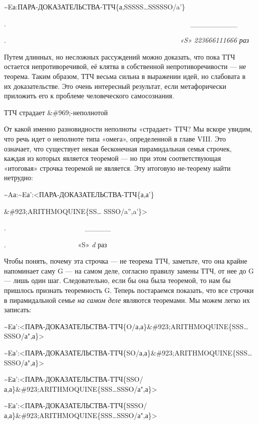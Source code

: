 \documentclass[../main.tex]{subfiles}
\begin{document}
\textasciitilde Eа:ПАРА-ДОКАЗАТЕЛЬСТВА-ТТЧ\{а,SSSSS\ldots SSSSSO/a'\}

.~~~~~~~~~~~~~~~~~~~~~~~~~~~~~~~~~~~~~~~~~~~~~~~~~~~~~\textbar\_\_\_\_\_\_\_\_\_\textbar{}

.~~~~~~~~~~~~~~~~~~~~~~~~~~~~~~~~~~~~~~~~~~~~~~~~~~\emph{«S» 223666111666 раз}

Путем длинных, но несложных рассуждений можно доказать, что пока ТТЧ остается непротиворечивой, её клятва в собственной непротиворечивости --- не теорема. Таким образом, ТТЧ весьма сильна в выражении идей, но слабовата в их доказательстве. Это очень интересный результат, если метафорически приложить его к проблеме человеческого самосознания.

ТТЧ страдает \&\#969;-неполнотой

От какой именно разновидности неполноты «страдает» ТТЧ? Мы вскоре увидим, что речь идет о неполноте типа «омега», определенной в главе VIII. Это означает, что существует некая бесконечная пирамидальная семья строчек, каждая из которых является теоремой --- но при этом соответствующая «итоговая» строчка теоремой не является. Эту итоговую не-теорему найти нетрудно:

\textasciitilde Aа:\textasciitilde Eа':\textless ПАРА-ДОКАЗАТЕЛЬСТВА-ТТЧ\{а,а'\}

\&\#923;ARITHMOQUINE\{SS\ldots{} SSSO/a'',a'\}\textgreater{}

.~~~~~~~~~~~~~~~~~~~~~~ \textbar\_\_\_\_\_\textbar{}

.~~~~~~~~~~~~~~~~~~~~ «S» \emph{d} раз

Чтобы понять, почему эта строчка --- не теорема ТТЧ, заметьте, что она крайне напоминает саму G --- на самом деле, согласно правилу замены ТТЧ, от нее до G --- лишь один шаг. Следовательно, если бы она была теоремой, то нам бы пришлось признать теоремность G. Теперь постараемся показать, что все строчки в пирамидальной семье \emph{на самом деле} являются теоремами. Мы можем легко их записать:

\textasciitilde Eа':\textless ПАРА-ДОКАЗАТЕЛЬСТВА-ТТЧ\{O/а,а\}\&\#923;ARITHMOQUINE\{SSS\ldots SSSO/а",а\}\textgreater{}

\textasciitilde Eа':\textless ПАРА-ДОКАЗАТЕЛЬСТВА-ТТЧ\{SO/а,а\}\&\#923;ARITHMOQUINE\{SSS\ldots SSSO/а",а\}\textgreater{}

\textasciitilde Eа':\textless ПАРА-ДОКАЗАТЕЛЬСТВА-ТТЧ\{SSO/а,а\}\&\#923;ARITHMOQUINE\{SSS\ldots SSSO/а",а\}\textgreater{}

\textasciitilde Eа':\textless ПАРА-ДОКАЗАТЕЛЬСТВА-ТТЧ\{SSSO/а,а\}\&\#923;ARITHMOQUINE\{SSS\ldots SSSO/а",а\}\textgreater{}
\end{document}
